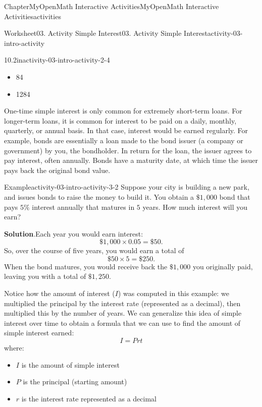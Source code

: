 \documentclass[oneside,10pt,]{book}
\newcommand{\blocktitlefont}{\relax}
\newcommand{\ptxlistdisc}{\raisebox{0.3ex}{\textbullet}}
\begin{document}
\begin{chapterptx}{Chapter}{MyOpenMath Interactive Activities}{}{MyOpenMath Interactive Activities}{}{}{activities}
\begin{worksheet-section}{Worksheet}{03. Activity Simple Interest}{}{03. Activity Simple Interest}{}{}{activity-03-intro-activity}
\begin{divisionexercise}{1}{}{0.2in}{activity-03-intro-activity-2-4}
\begin{itemize}[label=\ptxlistdisc]
\item{}84%
\item{}1284%
\end{itemize}
%
\end{divisionexercise}%
\clearpage
One-time simple interest is only common for extremely short-term loans. For longer-term loans, it is common for interest to be paid on a daily, monthly, quarterly, or annual basis. In that case, interest would be earned regularly. For example, bonds are essentially a loan made to the bond issuer (a company or government) by you, the bondholder. In return for the loan, the issuer agrees to pay interest, often annually. Bonds have a maturity date, at which time the issuer pays back the original bond value.%
\begin{example}{Example}{}{activity-03-intro-activity-3-2}%
Suppose your city is building a new park, and issues bonds to raise the money to build it. You obtain a \(\$1,000\) bond that pays \(5\%\) interest annually that matures in \(5\) years. How much interest will you earn?%
\par\smallskip%
\noindent\textbf{\blocktitlefont Solution}.\hypertarget{activity-03-intro-activity-3-2-2}{}\quad{}Each year you would earn interest:%
\begin{equation*}
\$1,000 \times 0.05 = \$50\text{.}
\end{equation*}
So, over the course of five years, you would earn a total of%
\begin{equation*}
\$50 \times 5 = \$250\text{.}
\end{equation*}
When the bond matures, you would receive back the \(\$1,000\) you originally paid, leaving you with a total of \(\$1,250\).%
\end{example}
Notice how the amount of interest (\(I\)) was computed in this example: we multiplied the principal by the interest rate (represented as a decimal), then multiplied this by the number of years. We can generalize this idea of simple interest over time to obtain a formula that we can use to find the amount of simple interest earned:%
\begin{equation*}
I = Prt
\end{equation*}
where:%
\begin{itemize}[label=\ptxlistdisc]
\item{}\(I\) is the amount of simple interest%
\item{}\(P\) is the principal (starting amount)%
\item{}\(r\) is the interest rate represented as a decimal%

\end{itemize}
\end{worksheet-section}
\end{chapterptx}
\end{document}
